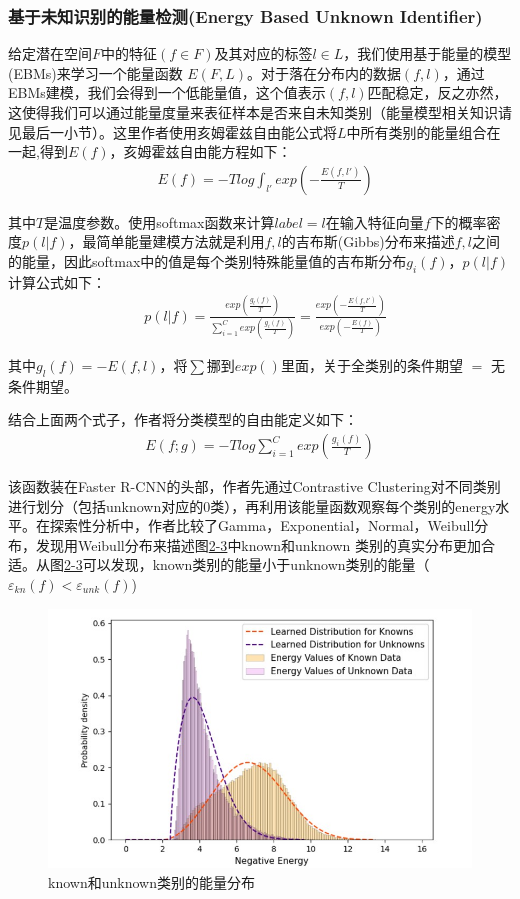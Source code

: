 \subsubsection{基于未知识别的能量检测(Energy Based Unknown Identifier)}

给定潜在空间$F$中的特征$(f \in F)$及其对应的标签$l \in L$，我们使用基于能量的模型(EBMs)来学习一个能量函数 $E(F,L)$。对于落在分布内的数据$(f,l)$，通过EBMs建模，我们会得到一个低能量值，这个值表示$(f,l)$匹配稳定，反之亦然，这使得我们可以通过能量度量来表征样本是否来自未知类别（能量模型相关知识请见最后一小节）。这里作者使用亥姆霍兹自由能公式将$L$中所有类别的能量组合在一起,得到$E(f)$，亥姆霍兹自由能方程如下：
\begin{align}
&E(f) = -Tlog\int_{l'}exp(-\frac{E(f,l')}{T})
\end{align}

其中$T$是温度参数。使用softmax函数来计算$label = l$在输入特征向量$f$下的概率密度$p(l|f)$，最简单能量建模方法就是利用$f,l$的吉布斯(Gibbs)分布来描述$f,l$之间的能量，因此softmax中的值是每个类别特殊能量值的吉布斯分布$g_i(f)$，$p(l|f)$计算公式如下：
\begin{align}
& p(l|f) = \frac{exp(\frac{g_l(f)}{T})}{\sum_{i=1}^C exp(\frac{g_i(f)}{T})} = \frac{exp(-\frac{E(f,l')}{T})}{exp(-\frac{E(f)}{T})}
\end{align}

其中$g_l(f) = -E(f,l)$，将$\sum$挪到$exp()$里面，关于全类别的条件期望 $=$ 无条件期望。

结合上面两个式子，作者将分类模型的自由能定义如下：
\begin{align}
E(f;g) = -Tlog \sum_{i=1}^C exp(\frac{g_i(f)}{T})
\end{align}

该函数装在Faster R-CNN的头部，作者先通过Contrastive Clustering对不同类别进行划分（包括unknown对应的0类），再利用该能量函数观察每个类别的energy水平。在探索性分析中，作者比较了Gamma，Exponential，Normal，Weibull分布，发现用Weibull分布来描述图\href{fig:2-3}{2-3}中known和unknown 类别的真实分布更加合适。从图\href{fig:2-3}{2-3}可以发现，known类别的能量小于unknown类别的能量（$\varepsilon_{kn}(f) < \varepsilon_{unk}(f)$)

\begin{figure}
  \centering
  \includegraphics[width=5in]{figure/example/openset3.jpg}
  \caption{known和unknown类别的能量分布}
  \label{fig:2-3}
\end{figure}

